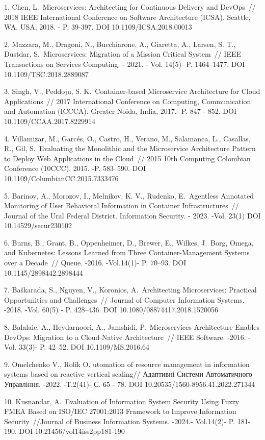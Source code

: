 \begin{references}
1. Chen, L.~Microservices: Architecting for Continuous Delivery and
DevOps~// 2018 IEEE International Conference on Software Architecture
(ICSA). Seattle, WA, USA, 2018. - P. 39-397. DOI
10.1109/ICSA.2018.00013

2. Mazzara, M., Dragoni, N., Bucchiarone, A., Giaretta, A., Larsen, S.
T., Dustdar, S.~Microservices: Migration of a Mission Critical
System~// IEEE Transactions on Services Computing. - 2021. - Vol.
14(5)- P. 1464--1477. DOI 10.1109/TSC.2018.2889087

3. Singh, V., Peddoju, S. K.~Container-based Microservice Architecture
for Cloud Applications~// 2017 International Conference on Computing,
Communication and Automation (ICCCA). Greater Noida, India, 2017.- P.
847 - 852. DOI 10.1109/CCAA.2017.8229914

4. Villamizar, M., Garcés, O., Castro, H., Verano, M., Salamanca, L.,
Casallas, R., Gil, S.~Evaluating the Monolithic and the Microservice
Architecture Pattern to Deploy Web Applications in the Cloud~// 2015
10th Computing Colombian Conference (10CCC), 2015. -P. 583--590. DOI
10.1109/ColumbianCC.2015.7333476

5. Barinov, A., Morozov, I., Melnikov, K. V., Rudenko, E.~Agentless
Annotated Monitoring of User Behavioral Information in Container
Infrastructures~// Journal of the Ural Federal District. Information
Security. - 2023. -Vol. 23(1) DOI 10.14529/secur230102

6. Burns, B., Grant, B., Oppenheimer, D., Brewer, E., Wilkes, J.~Borg,
Omega, and Kubernetes: Lessons Learned from Three Container-Management
Systems over a Decade~// Queue. -2016. -Vol.14(1)- P. 70--93. DOI
10.1145/2898442.2898444

7. Baškarada, S., Nguyen, V., Koronios, A.~Architecting Microservices:
Practical Opportunities and Challenges~// Journal of Computer
Information Systems. -2018. -Vol. 60(5) - P. 428--436. DOI
10.1080/08874417.2018.1520056

8. Balalaie, A., Heydarnoori, A., Jamshidi, P.~Microservices Architecture
Enables DevOps: Migration to a Cloud-Native Architecture~// IEEE
Software. -2016. -Vol. 33(3)- P. 42--52. DOI 10.1109/MS.2016.64

9. Omelchenko V., Rolik O. utomation of resource management in
information systems based on reactive vertical scaling// Адаптивні
Системи Автоматичного Управління. -2022. -Т.2(41)- С. 65 - 78. DOI
10.20535/1560-8956.41.2022.271344

10. Kusnandar, A.~Evaluation of Information System Security Using Fuzzy
FMEA Based on ISO/IEC 27001:2013 Framework to Improve Information
Security~//Journal of Business Information Systems. -2024.- Vol.14(2)-
P. 181- 190. DOI 10.21456/vol14iss2pp181-190


\end{references}
